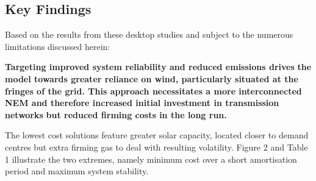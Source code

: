 \documentclass[
  letterpaper,
  DIV=11,
  numbers=noendperiod]{scrartcl}
\begin{document}
\subsection{Key Findings}\label{key-findings}

Based on the results from these desktop studies and subject to the
numerous limitations discussed herein:

\textbf{Targeting improved system reliability and reduced emissions
drives} \textbf{the model towards greater reliance on wind, particularly
situated at the} \textbf{fringes of the grid. This approach necessitates
a more interconnected} \textbf{NEM and therefore increased initial
investment in transmission networks} \textbf{but reduced firming costs
in the long run.}

The lowest cost solutions feature greater solar capacity, located closer
to demand centres but extra firming gas to deal with resulting
volatility. Figure 2 and Table 1 illustrate the two extremes, namely
minimum cost over a short amortisation period and maximum system
stability.
\end{document}
